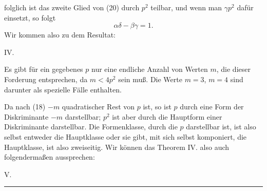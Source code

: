 folglich ist das zweite Glied von (20) durch $p^2$ teilbar, und wenn
man $\gamma p^2$ dafür einsetzt, so folgt
\[
\alpha\delta - \beta\gamma = 1.
\]
Wir kommen also zu dem Resultat:

IV. 

Es gibt für ein gegebenes $p$ nur eine endliche Anzahl von
Werten $m$, die dieser Forderung entsprechen, da $m < 4p^2$ sein
muß. Die Werte $m=3$, $m=4$ sind darunter als spezielle
Fälle enthalten.

Da nach (18) $-m$ quadratischer Rest von $p$ ist, so ist $p$
durch eine Form der Diskriminante $-m$ darstellbar; $p^2$ ist aber
durch die Hauptform einer Diskriminante darstellbar. Die
Formenklasse, durch die $p$ darstellbar ist, ist also selbst entweder
die Hauptklasse oder sie gibt, mit sich selbst komponiert, die
Hauptklasse, ist also zweiseitig. Wir können das Theorem IV. also
auch folgendermaßen aussprechen:

V. 

\begin{center}\rule{0.18\linewidth}{0.4pt}\end{center}
